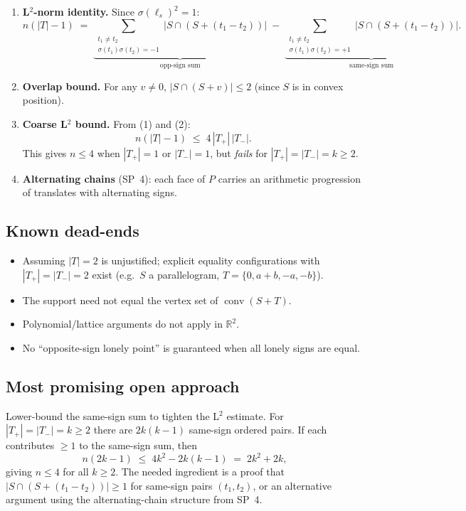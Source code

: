 \documentclass[12pt,a4paper]{article}
\theoremstyle{definition}
\begin{document}
\begin{enumerate}
\item \textbf{L$^2$-norm identity.}  Since $\sigma(\ell_s)^2=1$:
\[
  n(|T|-1) \;=\; \underbrace{\sum_{\substack{t_1\ne t_2\\\sigma(t_1)\sigma(t_2)=-1}}
  |S\cap(S+(t_1-t_2))|}_{\text{opp-sign sum}}
  \;-\;
  \underbrace{\sum_{\substack{t_1\ne t_2\\\sigma(t_1)\sigma(t_2)=+1}}
  |S\cap(S+(t_1-t_2))|}_{\text{same-sign sum}}.
\]

\item \textbf{Overlap bound.}  For any $v\ne 0$, $|S\cap(S+v)|\le 2$
(since $S$ is in convex position).

\item \textbf{Coarse L$^2$ bound.}  From (1) and (2):
\[
  n(|T|-1) \;\le\; 4\,|T_+|\,|T_-|.
\]
This gives $n\le 4$ when $|T_+|=1$ or $|T_-|=1$, but \emph{fails} for
$|T_+|=|T_-|=k\ge 2$.

\item \textbf{Alternating chains} (SP~4): each face of $P$ carries an arithmetic
progression of translates with alternating signs.
\end{enumerate}

\subsection*{Known dead-ends}

\begin{itemize}
\item Assuming $|T|=2$ is unjustified; explicit equality configurations with $|T_+|=|T_-|=2$ exist (e.g.\ $S$ a parallelogram, $T=\{0,a+b,-a,-b\}$).
\item The support need not equal the vertex set of $\operatorname{conv}(S+T)$.
\item Polynomial/lattice arguments do not apply in $\mathbb{R}^2$.
\item No ``opposite-sign lonely point'' is guaranteed when all lonely signs are equal.
\end{itemize}

\subsection*{Most promising open approach}

Lower-bound the same-sign sum to tighten the L$^2$ estimate.
For $|T_+|=|T_-|=k\ge 2$ there are $2k(k-1)$ same-sign ordered pairs.
If each contributes $\ge 1$ to the same-sign sum, then
\[
  n(2k-1) \;\le\; 4k^2 - 2k(k-1) \;=\; 2k^2+2k,
\]
giving $n\le 4$ for all $k\ge 2$.  The needed ingredient is a proof that
$|S\cap(S+(t_1-t_2))|\ge 1$ for same-sign pairs $(t_1,t_2)$, or an alternative
argument using the alternating-chain structure from SP~4.
\end{document}

